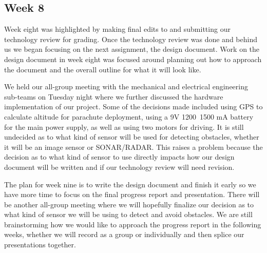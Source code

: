 \documentclass[10pt,letterpaper,onecolumn,draftclsnofoot,journal]{IEEEtran}
\begin{document}
\subsection{Week 8}
\par
Week eight was highlighted by making final edits to and submitting our technology review for grading. Once the technology review was done and behind us we began focusing on the next assignment, the design document. Work on the design document in week eight was focused around planning out how to approach the document and the overall outline for what it will look like.
\par
We held our all-group meeting with the mechanical and electrical engineering sub-teams on Tuesday night where we further discussed the hardware implementation of our project. Some of the decisions made included using GPS to calculate altitude for parachute deployment, using a 9V 1200~1500 mA battery for the main power supply, as well as using two motors for driving. It is still undecided as to what kind of sensor will be used for detecting obstacles, whether it will be an image sensor or SONAR/RADAR. This raises a problem because the decision as to what kind of sensor to use directly impacts how our design document will be written and if our technology review will need revision.
\par
The plan for week nine is to write the design document and finish it early so we have more time to focus on the final progress report and presentation. There will be another all-group meeting where we will hopefully finalize our decision as to what kind of sensor we will be using to detect and avoid obstacles. We are still brainstorming how we would like to approach the progress report in the following weeks, whether we will record as a group or individually and then splice our presentations together.
\end{document}
